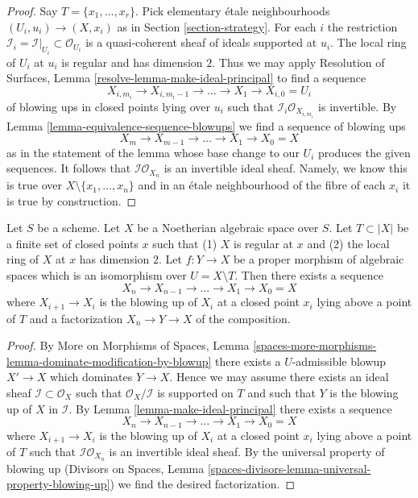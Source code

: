 \begin{proof}
Say $T = \{x_1, \ldots, x_r\}$. Pick elementary \'etale neighbourhoods
$(U_i, u_i) \to (X, x_i)$ as in Section \ref{section-strategy}.
For each $i$ the restriction
$\mathcal{I}_i = \mathcal{I}|_{U_i} \subset \mathcal{O}_{U_i}$
is a quasi-coherent sheaf of ideals supported at $u_i$.
The local ring of $U_i$ at $u_i$ is regular and has dimension $2$.
Thus we may apply
Resolution of Surfaces, Lemma \ref{resolve-lemma-make-ideal-principal}
to find a sequence
$$
X_{i, m_i} \to X_{i, m_i - 1} \to \ldots \to X_1 \to X_{i, 0} = U_i
$$
of blowing ups in closed points lying over $u_i$ such that
$\mathcal{I}_i \mathcal{O}_{X_{i, m_i}}$ is invertible.
By Lemma \ref{lemma-equivalence-sequence-blowups}
we find a sequence of blowing ups
$$
X_m \to X_{m - 1} \to \ldots \to X_1 \to X_0 = X
$$
as in the statement of the lemma whose base change to our $U_i$
produces the given sequences. It follows that
$\mathcal{I}\mathcal{O}_{X_n}$ is an invertible ideal sheaf.
Namely, we know this is true over $X \setminus \{x_1, \ldots, x_n\}$
and in an \'etale neighbourhood of the fibre of each $x_i$
it is true by construction.
\end{proof}

\begin{lemma}
\label{lemma-dominate-by-blowing-up-in-points}
Let $S$ be a scheme. Let $X$ be a Noetherian algebraic space over $S$.
Let $T \subset |X|$ be a finite set of closed points $x$ such that
(1) $X$ is regular at $x$ and (2) the local ring of $X$ at $x$ has
dimension $2$. Let $f : Y \to X$ be a proper morphism of
algebraic spaces which is an isomorphism over $U = X \setminus T$.
Then there exists a sequence
$$
X_n \to X_{n - 1} \to \ldots \to X_1 \to X_0 = X
$$
where $X_{i + 1} \to X_i$ is the blowing up of $X_i$ at a closed
point $x_i$ lying above a point of $T$ and a factorization $X_n \to Y \to X$
of the composition.
\end{lemma}

\begin{proof}
By More on Morphisms of Spaces,
Lemma \ref{spaces-more-morphisms-lemma-dominate-modification-by-blowup} 
there exists a $U$-admissible blowup $X' \to X$ which dominates
$Y \to X$. Hence we may assume there exists an ideal sheaf
$\mathcal{I} \subset \mathcal{O}_X$ such that
$\mathcal{O}_X/\mathcal{I}$ is supported on $T$ and such that
$Y$ is the blowing up of $X$ in $\mathcal{I}$.
By Lemma \ref{lemma-make-ideal-principal} 
there exists a sequence
$$
X_n \to X_{n - 1} \to \ldots \to X_1 \to X_0 = X
$$
where $X_{i + 1} \to X_i$ is the blowing up of $X_i$ at a closed
point $x_i$ lying above a point of $T$ such that
$\mathcal{I}\mathcal{O}_{X_n}$ is an invertible ideal sheaf.
By the universal property of blowing up
(Divisors on Spaces, Lemma
\ref{spaces-divisors-lemma-universal-property-blowing-up})
we find the desired factorization.
\end{proof}





